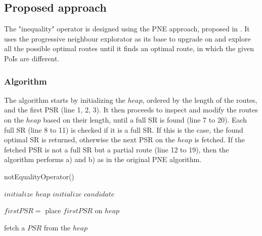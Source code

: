 
\subsection{Proposed approach} 
\label{sec:approachNEO}
The "inequality" operator is designed using the PNE approach, proposed in \cite{OSR}. It uses the progressive neighbour explorator as its base to upgrade on and explore all the possible optimal routes until it finds an optimal route, in which the given PoIs are different.

\subsubsection{Algorithm}
\label{sec:algortihmNEO}
The algorithm \texttt{} starts by initializing the $heap$, ordered by the length of the routes, and the first PSR (line 1, 2, 3). It then proceeds to inspect and modify the routes on the $heap$ based on their length, until a full SR is found (line 7 to 20). Each full SR (line 8 to 11) is checked if it is a full SR. If this is the case, the found optimal SR is returned, otherwise the next PSR on the $heap$ is fetched. If the fetched PSR is not a full SR but a partial route (line 12 to 19), then the algorithm performs a) and b) as in the original PNE algorithm. \newline

\begin{algorithm}[H]
\caption{notEqualityOperator()}
\label{alg:notequality}
	
	
	\BlankLine
	
	$initialize$ $heap$\;
	$initialize$ $candidate$\;
	
	$firstPSR =$\;
	place $firstPSR$ on $heap$\;
	
	\BlankLine
	
	
	fetch a $PSR$ from the $heap$\;
	
\end{algorithm}

